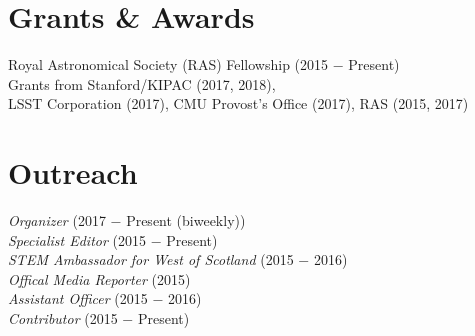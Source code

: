 \documentclass[]{deedy-resume-openfont}
\begin{document}
\begin{minipage}[t]{0.33\textwidth}
\section{\color{Blue} Grants \& Awards} 
\textbullet{} Royal Astronomical Society (RAS) Fellowship (2015 $-$ Present) \\
\textbullet{} Grants from Stanford/KIPAC (2017, 2018), \\ LSST Corporation (2017), CMU Provost's Office (2017), RAS (2015, 2017)\\
\sectionsep


\section{\color{Blue} Outreach}
 \textit{Organizer} (2017 $-$ Present (biweekly)) \\
 \textit{Specialist Editor} (2015 $-$ Present) \\
 \textit{STEM Ambassador for West of Scotland} (2015 $-$ 2016) \\
 \textit{Offical Media Reporter} (2015) \\
 \textit{Assistant Officer} (2015 $-$ 2016) \\
 \textit{Contributor} (2015 $-$ Present) \\
\sectionsep



%
%

\end{minipage} 
\hfill
\end{document}
